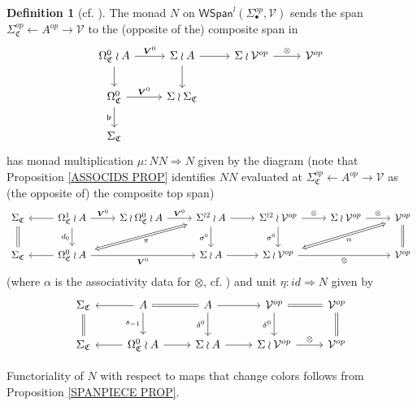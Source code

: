 \documentclass[a4paper,10pt
]{article}%
\numberwithin{equation}{section}
\numberwithin{figure}{section}
\theoremstyle{definition} %
\newtheorem{definition}[equation]{Definition}%
\newcommand{\V}{\ensuremath{\mathcal V}}
\newcommand{\1}{\ensuremath{\mathbbm 1}}%
\begin{document}
\begin{definition}[{cf. \cite[Def. 4.15]{BP21}}]
        \label{NCOLOR DEF}
	The monad $N$ on 
	$\mathsf{WSpan}^l(\Sigma_{\bullet}^{op},\mathcal{V})$
	sends the span 
	$\Sigma^{op}_{\mathfrak{C}} \leftarrow A^{op} \to \mathcal{V}$
	to the (opposite of the) composite span in
	\begin{equation}\label{NCOLOR EQ}
	\begin{tikzcd}
	\Omega^0_{\mathfrak{C}} \wr A \ar{r}{\boldsymbol{V}^0} \ar{d} &
	\Sigma \wr A  \ar{d} \ar{r} &
	\Sigma \wr \mathcal{V}^{op} \ar{r}{\otimes} &
	\mathcal{V}^{op}
	\\
	\Omega^0_{\mathfrak{C}} \ar{r}{\boldsymbol{V}^0} \arrow[d, "\mathsf{lr}"'] &
	\Sigma \wr \Sigma_{\mathfrak{C}} 
	\\
	\Sigma_{\mathfrak{C}}
	\end{tikzcd}
	\end{equation}
	has monad multiplication
	$\mu \colon N N
	\Rightarrow 
	N$ given by the diagram
	(note that Proposition \ref{ASSOCIDS PROP} identifies 
	$NN$ evaluated at 
	$\Sigma^{op}_{\mathfrak{C}} \leftarrow A^{op} \to \V$
	as (the opposite of) the composite top span)
	\begin{equation}\label{NMONMULTTR EQ}
	\begin{tikzcd}
	\Sigma_{\mathfrak{C}} \ar[equal]{d}&
	\Omega^1_{\mathfrak{C}} \wr A \ar{l} \arrow[r, "\boldsymbol{V}^0"] \ar{d}[swap]{d_0}&
	\Sigma \wr \Omega^0_{\mathfrak{C}} \wr A \arrow[r, "\boldsymbol{V}^0"] &
	|[alias=U]|
	\Sigma^{\wr 2} \wr A \ar{r} \ar{d}[swap]{\sigma^0} &
	\Sigma^{\wr 2} \wr \mathcal{V}^{op} \ar{r}{\otimes} \ar{d}[swap]{\sigma^0} &
	\Sigma \wr \mathcal{V}^{op} \ar{r}{\otimes} &
	|[alias=UU]|
	\mathcal{V}^{op} \ar[equal]{d}
	\\
	\Sigma_{\mathfrak{C}} &
	|[alias=V]|
	\Omega^0_{\mathfrak{C}} \wr A \ar{l} \ar{rr}[swap]{\boldsymbol{V}^0} & &
	\Sigma \wr A \ar{r} &
	|[alias=VV]|
	\Sigma \wr \mathcal{V}^{op} \ar{rr}[swap]{\otimes} & &
	\mathcal{V}^{op}
	\arrow[Leftrightarrow, from=V, to=U,shorten >=0.15cm,shorten <=0.15cm
	,swap,"\pi"
	]
	\arrow[Leftrightarrow, from=VV, to=UU,shorten >=0.15cm,shorten <=0.15cm,swap,"\alpha"
	]
	\end{tikzcd}
	\end{equation}
	(where $\alpha$ is the associativity data for
	$\otimes$, cf. \cite[(2.14)]{BP21})
	and unit
	$\eta \colon id \Rightarrow N$ given by
	\begin{equation}\label{NMONIDTR EQ}
	\begin{tikzcd}
	\Sigma_{\mathfrak{C}} \ar[equal]{d} & 
	A \ar{d}[swap]{s_{-1}} \ar{l} \ar[equal]{r} &
	A \ar{d}[swap]{\delta^0} \ar{r} &
	\mathcal{V}^{op} \ar{d}[swap]{\delta^0} \ar[equal]{r} &
	\mathcal{V}^{op} \ar[equal]{d}
	\\
	\Sigma_{\mathfrak{C}} &
	\Omega^0_{\mathfrak{C}} \wr A \ar{l} \ar{r} &
	\Sigma \wr A \ar{r} &
	\Sigma \wr \mathcal{V}^{op} \ar{r}{\otimes} &
	\mathcal{V}^{op}
	\end{tikzcd}
	\end{equation}
	
	Functoriality of $N$ with respect to maps that change colors follows from Proposition \ref{SPANPIECE PROP}.
\end{definition}
\end{document}
